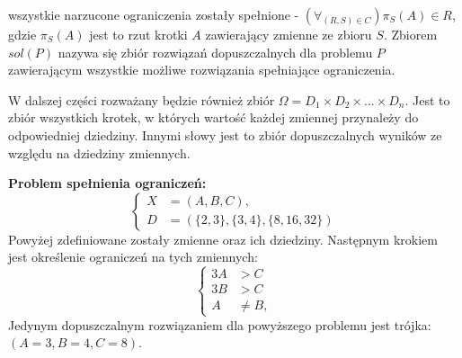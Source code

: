 wszystkie narzucone ograniczenia zostały spełnione - $(\forall_{(R, S) \in C}) \pi_S(A) \in R$, gdzie
$\pi_S(A)$ jest to rzut krotki $A$ zawierający zmienne ze zbioru $S$. Zbiorem $sol(P)$ nazywa się zbiór rozwiązań
dopuszczalnych dla problemu $P$ zawierającym wszystkie możliwe rozwiązania spełniające ograniczenia.
\par
W dalszej części rozważany będzie również zbiór $\Omega = D_1 \times D_2 \times ... \times D_n$.
Jest to zbiór wszystkich krotek, w których wartość każdej zmiennej przynależy do odpowiedniej dziedziny.
Innymi słowy jest to zbiór dopuszczalnych wyników ze względu na dziedziny zmiennych.
\par
\begin{example}
\textbf{Problem spełnienia ograniczeń:}
\begin{equation}
    \left\{
        \begin{aligned}
            X &= (A, B, C), \\
            D &= (\{2,3\}, \{3,4\}, \{8,16,32\})
        \end{aligned}
    \right.
\end{equation}
Powyżej zdefiniowane zostały zmienne oraz ich dziedziny. Następnym krokiem jest określenie ograniczeń na tych zmiennych:
\begin{equation}
    \left\{
        \begin{aligned}
            3A &> C \\
            3B &> C \\
            A &\neq B,
        \end{aligned}
    \right.
\end{equation}
Jedynym dopuszczalnym rozwiązaniem dla powyższego problemu jest trójka: $(A=3, B=4, C=8)$.
\end{example}

